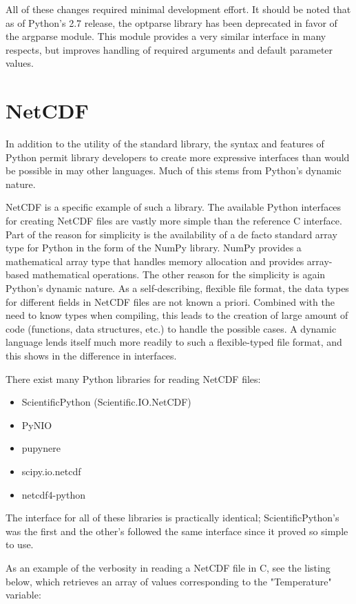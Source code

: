 \documentclass[twocolumn]{article}
\begin{document}
All of these changes required minimal development effort. It should be noted
that as of Python's 2.7 release, the optparse library has been deprecated in
favor of the argparse module. This module provides a very similar interface
in many respects, but improves handling of required arguments and default
parameter values. \cite{REFERENCE!}

\section{NetCDF}
In addition to the utility of the standard library, the syntax and features of Python
permit library developers to create more expressive interfaces than would be possible
in may other languages. Much of this stems from Python's dynamic nature.

NetCDF is a specific example of such a library. The available Python interfaces for creating
NetCDF files are vastly more simple than the reference C interface. Part of the reason for
simplicity is the availability of a de facto standard array type for Python in the form of the NumPy library. NumPy
provides a mathematical array type that handles memory allocation and provides array-based
mathematical operations. The other reason for the simplicity is again Python's dynamic nature.
As a self-describing, flexible file format, the data types for different fields in NetCDF
files are not known a priori. Combined with the need to know types when compiling, this
leads to the creation of large amount of code (functions, data structures, etc.) to handle
the possible cases.  A dynamic language lends itself much more readily to such a flexible-typed
file format, and this shows in the difference in interfaces.

There exist many Python libraries for reading NetCDF files:
\begin{itemize}
  \item ScientificPython (Scientific.IO.NetCDF)
  \item PyNIO
  \item pupynere
  \item scipy.io.netcdf
  \item netcdf4-python
\end{itemize}
The interface for all of these libraries is practically identical; ScientificPython's
was the first and the other's followed the same interface since it proved so
simple to use.

As an example of the verbosity in reading a NetCDF file in C, see the listing
below, which retrieves an array of values corresponding to the "Temperature"
variable:
\end{document}

